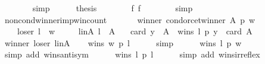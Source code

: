 \begin{isabellebody}
\ \ \ \ \ \ \isamarkupfalse%
\ simp\isanewline
\ \ \ \ \isamarkupfalse%
\ {\isacharquery}{\kern0pt}thesis\isanewline
\ \ \ \ \ \ \isamarkupfalse%
\ f{}\ f{}\isanewline
\ \ \ \ \ \ \isamarkupfalse%
\ simp\isanewline
\ \ \isamarkupfalse%
\isanewline
{}\isamarkupfalse%
%
\endisatagproof
{\isafoldproof}%
%
\isadelimproof
\isanewline
%
\endisadelimproof
\isanewline
\isanewline
{}\isamarkupfalse%
\ non{\isacharunderscore}{\kern0pt}cond{\isacharunderscore}{\kern0pt}winner{\isacharunderscore}{\kern0pt}imp{\isacharunderscore}{\kern0pt}win{\isacharunderscore}{\kern0pt}count{\isacharcolon}{\kern0pt}\isanewline
\ \ \isanewline
\ \ \ \ winner{\isacharcolon}{\kern0pt}\ {\isachardoublequoteopen}condorcet{\isacharunderscore}{\kern0pt}winner\ A\ p\ w{\isachardoublequoteclose}\ \isanewline
\ \ \ \ loser{\isacharcolon}{\kern0pt}\ {\isachardoublequoteopen}l\ {\isasymnoteq}\ w{\isachardoublequoteclose}\ \isanewline
\ \ \ \ l{\isacharunderscore}{\kern0pt}in{\isacharunderscore}{\kern0pt}A{\isacharcolon}{\kern0pt}\ {\isachardoublequoteopen}l\ {\isasymin}\ A{\isachardoublequoteclose}\isanewline
\ \ \ {\isachardoublequoteopen}card\ {\isacharbraceleft}{\kern0pt}y\ {\isasymin}\ A\ {\isachardot}{\kern0pt}\ wins\ l\ p\ y{\isacharbraceright}{\kern0pt}\ {\isacharless}{\kern0pt}{\isacharequal}{\kern0pt}\ card\ A\ {\isacharminus}{\kern0pt}\ {}{\isachardoublequoteclose}\isanewline
%
\isadelimproof
%
\endisadelimproof
%
\isatagproof
{}\isamarkupfalse%
\ {\isacharminus}{\kern0pt}\isanewline
\ \ \isamarkupfalse%
\ winner\ loser\ l{\isacharunderscore}{\kern0pt}in{\isacharunderscore}{\kern0pt}A\isanewline
\ \ \isamarkupfalse%
\ {\isachardoublequoteopen}wins\ w\ p\ l{\isachardoublequoteclose}\isanewline
\ \ \ \ \isamarkupfalse%
\ simp\isanewline
\ \ \isamarkupfalse%
\ {}{\isacharcolon}{\kern0pt}\ {\isachardoublequoteopen}{\isasymnot}\ wins\ l\ p\ w{\isachardoublequoteclose}\isanewline
\ \ \ \ \isamarkupfalse%
\ {\isacharparenleft}{\kern0pt}simp\ add{\isacharcolon}{\kern0pt}\ wins{\isacharunderscore}{\kern0pt}antisym{\isacharparenright}{\kern0pt}\isanewline
\ \ \isamarkupfalse%
\ {}{\isacharcolon}{\kern0pt}\ {\isachardoublequoteopen}{\isasymnot}\ wins\ l\ p\ l{\isachardoublequoteclose}\isanewline
\ \ \ \ \isamarkupfalse%
\ {\isacharparenleft}{\kern0pt}simp\ add{\isacharcolon}{\kern0pt}\ wins{\isacharunderscore}{\kern0pt}irreflex{\isacharparenright}{\kern0pt}\isanewline

\end{isabellebody}
